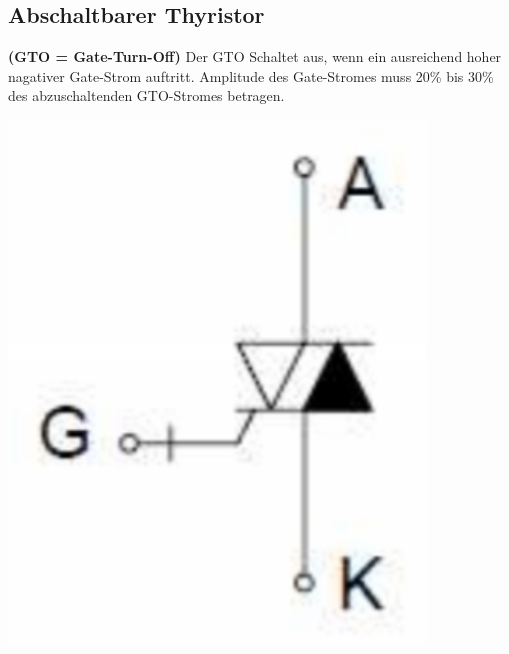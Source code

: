 \begin{minipage}{0.5\linewidth}
    \subsection{Abschaltbarer Thyristor}
    \begin{minipage}{0.7\linewidth}        
        \textbf{(GTO = Gate-Turn-Off)}\newline
        Der GTO Schaltet aus, wenn ein ausreichend hoher nagativer Gate-Strom auftritt.\newline
        Amplitude des Gate-Stromes muss 20\% bis 30\% des abzuschaltenden GTO-Stromes betragen.
    \end{minipage}
    \begin{minipage}{0.2\linewidth}
        \includegraphics[width=\linewidth]{images/GTOSymbol}
    \end{minipage}    
\end{minipage}
